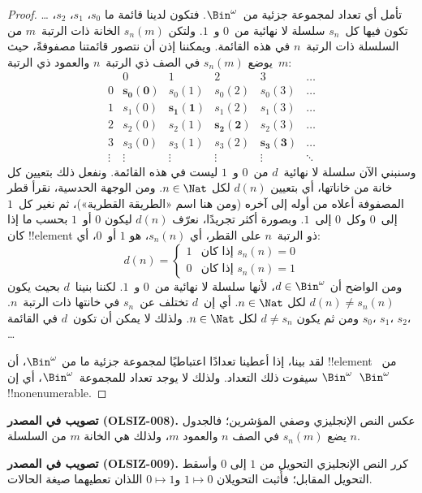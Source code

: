 \documentclass[../../../include/open-logic-section]{subfiles}
\begin{document}
\begin{proof}
تأمل أي تعداد لمجموعة جزئية من~$\Bin^\omega$. فتكون لدينا قائمة ما
$s_{0}$، $s_{1}$، $s_{2}$، \dots{} تكون فيها كل~$s_n$ سلسلة لا
نهائية من~$0$ و~$1$. ولتكن $s_n(m)$ الخانة ذات الرتبة~$m$ من السلسلة
ذات الرتبة~$n$ في هذه القائمة. ويمكننا إذن أن نتصور قائمتنا مصفوفةً،
حيث يوضع $s_n(m)$ في الصف ذي الرتبة~$n$ والعمود ذي الرتبة~$m$:
\[
\begin{array}{c|c|c|c|c|c}
& 0 & 1 & 2 & 3 & \dots \\\hline
0 & \mathbf{s_{0}(0)} & s_{0}(1) & s_{0}(2) & s_0(3) & \dots \\\hline
1 & s_{1}(0)& \mathbf{s_{1}(1)} & s_1(2) & s_1(3) & \dots \\\hline
2 & s_{2}(0)& s_{2}(1) & \mathbf{s_2(2)} & s_2(3) & \dots \\\hline
3 & s_{3}(0)& s_{3}(1) & s_3(2) & \mathbf{s_3(3)} & \dots \\\hline
\vdots & \vdots & \vdots & \vdots & \vdots & \mathbf{\ddots}
\end{array}
\]
وسنبني الآن سلسلة لا نهائية~$d$ من~$0$ و~$1$ ليست في هذه القائمة.
ونفعل ذلك بتعيين كل خانة من خاناتها، أي بتعيين $d(n)$ لكل $n \in
\Nat$. ومن الوجهة الحدسية، نقرأ قطر المصفوفة أعلاه من أوله إلى آخره
(ومن هنا اسم «الطريقة القطرية»)، ثم نغير كل~$1$ إلى~$0$ وكل~$0$
إلى~$1$. وبصورة أكثر تجريدًا، نعرّف $d(n)$ ليكون $0$ أو~$1$ بحسب ما
إذا كان !!{element} ذو الرتبة~$n$ على القطر، أي $s_n(n)$، هو $1$
أو~$0$، أي:
\[
d(n) =
\begin{cases}
1 & \text{إذا كان $s_{n}(n) = 0$}\\
0 & \text{إذا كان $s_{n}(n) = 1$}
\end{cases}
\]
ومن الواضح أن $d \in \Bin^\omega$، لأنها سلسلة لا نهائية من~$0$
و~$1$. لكننا بنينا~$d$ بحيث يكون $d(n) \neq s_n(n)$ لكل $n \in
\Nat$. أي إن~$d$ تختلف عن~$s_n$ في خانتها ذات الرتبة~$n$.
ومن ثم يكون $d \neq s_n$ لكل $n\in \Nat$. ولذلك لا يمكن أن تكون~$d$
في القائمة $s_0$، $s_1$، $s_2$،
\dots

لقد بينا، إذا أعطينا تعدادًا اعتباطيًا لمجموعة جزئية ما من
$\Bin^\omega$، أن !!{element} من~$\Bin^\omega$ سيفوت ذلك التعداد. ولذلك لا
يوجد تعداد للمجموعة~$\Bin^\omega$، أي إن~$\Bin^\omega$
!!{nonenumerable}.
\end{proof}

\begin{editorial}
\textbf{تصويب في المصدر (OLSIZ-008).}
عكس النص الإنجليزي وصفي المؤشرين؛ فالجدول يضع $s_n(m)$ في الصف $n$
والعمود $m$، ولذلك هي الخانة $m$ من السلسلة $n$.

\textbf{تصويب في المصدر (OLSIZ-009).}
كرر النص الإنجليزي التحويل من $1$ إلى $0$ وأسقط التحويل المقابل؛
فأُثبت التحويلان $1\mapsto0$ و$0\mapsto1$ اللذان تعطيهما صيغة الحالات.
\end{editorial}
\end{document}
